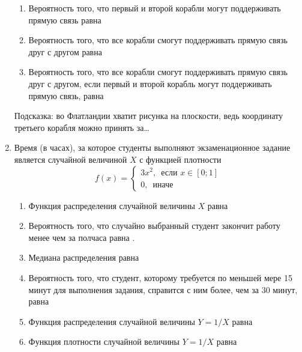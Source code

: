 \documentclass[12pt, a4paper]{article}\usepackage[]{graphicx}\usepackage[]{color}
\begin{document}
\begin{enumerate}
\begin{enumerate}
\item Вероятность того, что первый и второй корабли могут поддерживать прямую связь равна \underline{\hspace{2cm}}
\item Вероятность того, что все корабли смогут поддерживать прямую связь друг с другом равна \underline{\hspace{2cm}}
\item Вероятность того, что все корабли смогут поддерживать прямую связь друг с другом, если первый и второй корабль могут поддерживать прямую связь, равна \underline{\hspace{2cm}}
\end{enumerate}
Подсказка: во Флатландии хватит рисунка на плоскости, ведь координату третьего корабля можно принять за\ldots



\item Время (в часах), за которое студенты выполняют экзаменационное задание является случайной величиной $X$ с функцией плотности
\[
f(x)=\begin{cases}
3x^2, \, \text{ если } x \in [0;1] \\
0, \, \text{ иначе }
\end{cases}
\]

\begin{enumerate}
\item Функция распределения случайной величины $X$ равна \underline{\hspace{2cm}}
\item Вероятность того, что случайно выбранный студент закончит работу менее чем за полчаса равна \underline{\hspace{2cm}}.
\item Медиана распределения равна \underline{\hspace{2cm}}
\item Вероятность того, что студент, которому требуется по меньшей мере 15 минут для выполнения задания, справится с ним более, чем за 30 минут, равна \underline{\hspace{2cm}}
\item Функция распределения случайной величины $Y=1/X$ равна \underline{\hspace{2cm}}
\item Функция плотности случайной величины $Y=1/X$ равна \underline{\hspace{2cm}}
\end{enumerate}

\end{enumerate}
\end{document}
